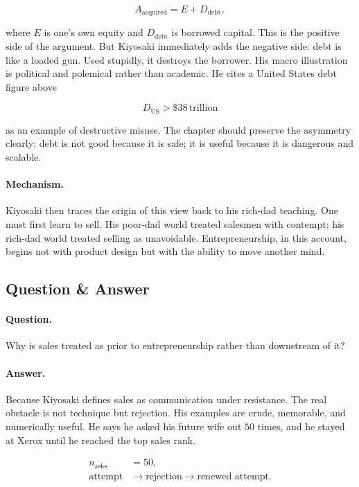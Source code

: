 \begin{equation}
A_{\text{acquired}} = E + D_{\text{debt}},
\end{equation}

where \(E\) is one's own equity and \(D_{\text{debt}}\) is borrowed capital. This is the positive side of the argument. But Kiyosaki immediately adds the negative side: debt is like a loaded gun. Used stupidly, it destroys the borrower. His macro illustration is political and polemical rather than academic. He cites a United States debt figure above

\begin{equation}
D_{\text{US}} > \$38\,\text{trillion}
\end{equation}

as an example of destructive misuse. The chapter should preserve the asymmetry clearly: debt is not good because it is safe; it is useful because it is dangerous and scalable.

\paragraph{Mechanism.} Kiyosaki then traces the origin of this view back to his rich-dad teaching. One must first learn to sell. His poor-dad world treated salesmen with contempt; his rich-dad world treated selling as unavoidable. Entrepreneurship, in this account, begins not with product design but with the ability to move another mind.

\subsection{Question \& Answer}

\paragraph{Question.} Why is sales treated as prior to entrepreneurship rather than downstream of it?

\paragraph{Answer.} Because Kiyosaki defines sales as communication under resistance. The real obstacle is not technique but rejection. His examples are crude, memorable, and numerically useful. He says he asked his future wife out \(50\) times, and he stayed at Xerox until he reached the top sales rank.

\begin{align}
n_{\text{asks}} &= 50,\\
\text{attempt} &\to \text{rejection} \to \text{renewed attempt}.
\end{align}

